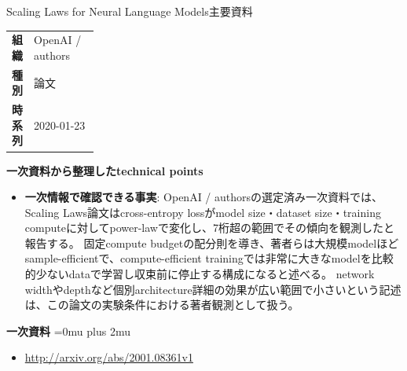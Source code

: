 \begin{technicalnote}{Scaling Laws for Neural Language Models}{主要資料}
\begingroup
\begin{tabularx}{\linewidth}{@{}>{\bfseries}p{0.22\linewidth}X@{}}
組織 & OpenAI / authors \\
種別 & 論文 \\
時系列 & 2020-01-23 \\
\end{tabularx}
\smallskip
\begin{minipage}{\linewidth}
{\bfseries 一次資料から整理したtechnical points}
\begin{itemize}[leftmargin=1.5em,itemsep=0.35em]
\item \textbf{一次情報で確認できる事実}: OpenAI / authorsの選定済み一次資料では、Scaling Laws論文はcross-entropy lossがmodel size・dataset size・training computeに対してpower-lawで変化し、7桁超の範囲でその傾向を観測したと報告する。 固定compute budgetの配分則を導き、著者らは大規模modelほどsample-efficientで、compute-efficient trainingでは非常に大きなmodelを比較的少ないdataで学習し収束前に停止する構成になると述べる。 network widthやdepthなど個別architecture詳細の効果が広い範囲で小さいという記述は、この論文の実験条件における著者観測として扱う。
\end{itemize}
\begin{samepage}
{\bfseries 一次資料}
\begingroup\sloppy
\Urlmuskip=0mu plus 2mu\relax
\begin{itemize}[leftmargin=1.5em,itemsep=0.25em]
\item {\scriptsize\url{http://arxiv.org/abs/2001.08361v1}}
\end{itemize}
\endgroup
\end{samepage}
\end{minipage}
\endgroup
\end{technicalnote}
\medskip

